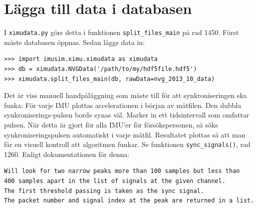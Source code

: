 \documentclass[captions=tableheading]{scrartcl}
\begin{document}
\section{Lägga till data i databasen}
\label{sec-5}
I \verb~ximudata.py~ görs detta i funktionen \texttt{split\_files\_main} på rad 1450. Först måste databasen öppnas. Sedan läggs data in:
\begin{verbatim}
>>> import imusim.ximu.ximudata as ximudata
>>> db = ximudata.NVGData('/path/to/my/hdf5file.hdf5')
>>> ximudata.split_files_main(db, rawData=nvg_2013_10_data)
\end{verbatim}
Det är viss manuell handpåläggning som måste till för att synkroniseringen ska funka: För varje IMU plottas accelerationen i början av mätfilen. Den dubbla synkroniserings-pulsen borde synas väl. Marker in ett tidsintervall som omfattar pulsen. När detta är gjort för alla IMU'er för försökspersonen, så söks synkroniseringspulsen automatiskt i varje måtfil. Resultatet plottas så att man får en visuell kontroll att algoritmen funkar. Se funktionen \texttt{sync\_signals()}, rad 1260. Enligt dokumentationen för denna:
\begin{verbatim}
Will look for two narrow peaks more than 100 samples but less than
400 samples apart in the list of signals at the given channel.
The first threshold passing is taken as the sync signal.
The packet number and signal index at the peak are returned in a list.
\end{verbatim}
\end{document}
